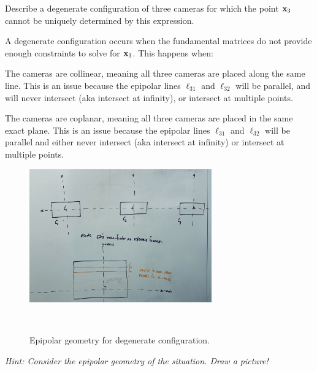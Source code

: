 \begin{problem}
\begin{enumroman}
    \newpage
    \item Describe a degenerate configuration of three cameras for which the point $\mathbf{x}_3$ cannot be
      uniquely determined by this expression.
      \begin{answer}
        A degenerate configuration occurs when the fundamental matrices do not provide
        enough constraints to solve for $\mathbf{x}_3$. This happens when:
        \begin{enumarabic}
          \item The cameras are collinear, meaning all three cameras are placed
            along the same line. This is an issue because the epipolar lines
            $\ell_{31}$ and $\ell_{32}$ will be parallel, and will never intersect
            (aka intersect at infinity), or intersect at multiple points.
          \item The cameras are coplanar, meaning all three cameras are placed
            in the same exact plane. This is an issue because the epipolar lines
            $\ell_{31}$ and $\ell_{32}$ will be parallel and either never
            intersect (aka intersect at infinity) or intersect at multiple points.
            \begin{figure}[H]
              \centering
              \includegraphics[width=0.7\textwidth]{figures/epipolars.jpg}
              \caption{Epipolar geometry for degenerate configuration.}
              ~\label{fig:2}
            \end{figure}
        \end{enumarabic}
      \end{answer}
  \end{enumroman}

  \emph{
    Hint: Consider the epipolar geometry of the situation. Draw a picture!
  }

\end{problem}
